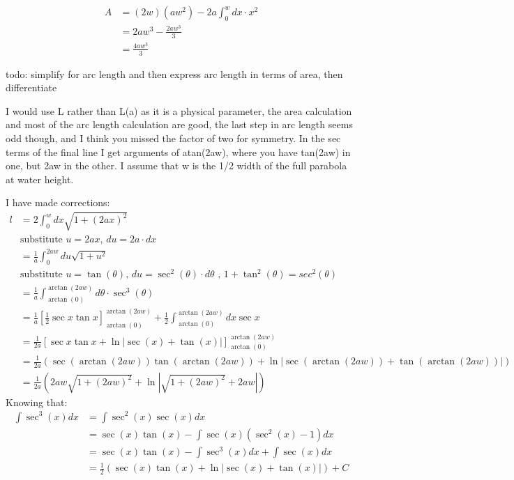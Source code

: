 \documentclass[12pt]{article}
\begin{document}
\begin{equation}
    \begin{split}
        A &= (2w)(aw^2) - 2a\int_0^w dx \cdot x^2
        \\ &=2aw^3 - \frac{2aw^3}{3}
        \\ &=\frac{4aw^3}{3}
    \end{split}
\end{equation}

todo: simplify for arc length and then express arc length in terms of area, then differentiate

I would use L rather than L(a) as it is a physical parameter, the area calculation and most of the arc length calculation are good, the last step in arc length seems odd though, and I think you missed the factor of two for symmetry. In the sec terms of the final line I get arguments of atan(2aw), where you have tan(2aw) in one, but 2aw in the other. I assume that w is the 1/2 width of the full parabola at water height.

I have made corrections:
\begin{equation}
    \begin{split}
        l&=2\int_0^wdx\sqrt{1 + (2ax)^2}
        \\ &\text{substitute }u=2ax\text{, }du=2a\cdot dx
        \\&=\frac{1}{a}\int_0^{2aw}du\sqrt{1 + u^2}
        \\ &\text{substitute }u=\tan(\theta)\text{, }du=\sec^2(\theta)\cdot d\theta\text{ , }1 + \tan^2(\theta) = sec^2(\theta)
        \\&=\frac{1}{a}\int_{\arctan(0)}^{\arctan{(2aw)}} d\theta \cdot \sec^3(\theta)
        \\&=\frac{1}{a}\left[\frac{1}{2}\sec{x}\tan{x}\right]_{\arctan(0)}^{\arctan(2aw)}+ \frac{1}{2}\int_{\arctan(0)}^{\arctan(2aw)} dx\sec{x}
        \\&= \frac{1}{2a}\left[\sec{x}\tan{x} + \ln{|\sec(x)+\tan(x)|}\right]_{\arctan(0)}^{\arctan(2aw)}
        \\&= \frac{1}{2a}(\sec(\arctan(2aw))\tan(\arctan(2aw)) + \ln{|\sec(\arctan(2aw))+\tan(\arctan(2aw))|})
        \\&=\frac{1}{2a}(2aw\sqrt{1 + (2aw)^2}+ \ln{|\sqrt{1 + (2aw)^2} + 2aw|})
    \end{split}
\end{equation}
Knowing that:
\begin{equation}
    \begin{split}
         \int \sec^3(x)dx &= \int \sec^2(x)\sec(x)dx
         \\&=\sec(x)\tan(x)-\int\sec(x)(\sec^2(x)-1)dx
         \\&=\sec(x)\tan(x)-\int\sec^3(x)dx+\int\sec(x)dx
         \\&=\frac{1}{2}\left(\sec(x)\tan(x)+\ln{|\sec(x)+\tan(x)|}\right) + C
    \end{split}
\end{equation}
\end{document}
